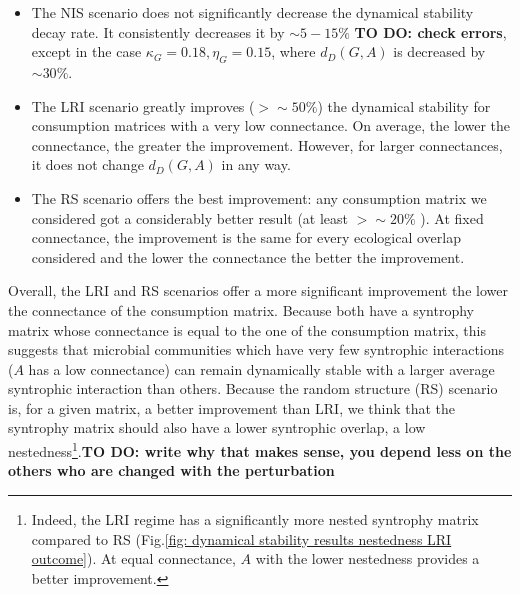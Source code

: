 \documentclass[12pt, titlepage]{report}
\begin{document}
\begin{itemize}
\item The NIS scenario does not significantly decrease the dynamical stability decay rate. It consistently decreases it by $\sim 5-15\%$ \textbf{TO DO: check errors}, except in the case $\kappa_G = 0.18, \eta_G=0.15$, where $d_D(G,A)$ is decreased by $\sim 30\%$.
\item The LRI scenario greatly improves ($> \sim 50\%$) the dynamical stability for consumption matrices with a very low connectance. On average, the lower the connectance, the greater the improvement. However, for larger connectances, it does not change $d_D(G,A)$ in any way.
\item The RS scenario offers the best improvement: any consumption matrix we considered got a considerably better result (at least $>\sim 20 \%$ ). At fixed connectance, the improvement is the same for every ecological overlap considered and the lower the connectance the better the improvement.
\end{itemize}
Overall, the LRI and RS scenarios offer a more significant improvement the lower the connectance of the consumption matrix. Because both have a syntrophy matrix whose connectance is equal to the one of the consumption matrix, this suggests that microbial communities which have very few syntrophic interactions (\ie $A$ has a low connectance) can remain dynamically stable with a larger average syntrophic interaction than others. Because the random structure (RS) scenario is, for a given matrix, a better improvement than LRI, we think that the syntrophy matrix should also have a lower syntrophic overlap, \ie a low nestedness\footnote{Indeed, the LRI regime has a significantly more nested syntrophy matrix compared to RS (Fig.\ref{fig: dynamical stability results nestedness LRI outcome}). At equal connectance, $A$ with the lower nestedness provides a better improvement.}.\textbf{TO DO: write why that makes sense, you depend less on the others who are changed with the perturbation}
\end{document}
